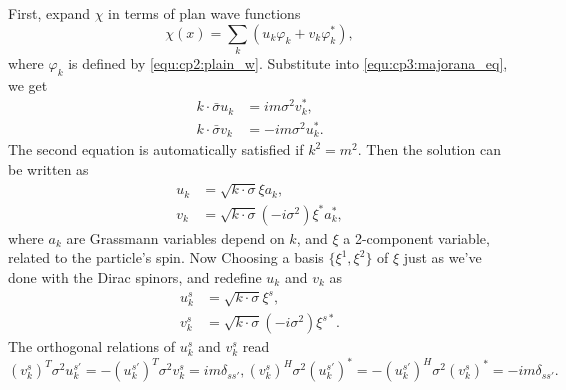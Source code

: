 \begin{problembody}
    \item First, expand $\chi$ in terms of plan wave functions
    \begin{equation}\label{equ:cp3:majorana_expand}
        \chi(x) = \sum_k \left(u_k \varphi_k + v_k \varphi_k^\ast\right),
    \end{equation}
    where $\varphi_k$ is defined by \eqref{equ:cp2:plain_w}. Substitute into \eqref{equ:cp3:majorana_eq}, we get
    \begin{subequations}
        \begin{align}
            k\cdot\bar{\sigma} u_k & = im\sigma^2 v_k^\ast, \\
            k\cdot\bar{\sigma} v_k & = -im\sigma^2 u_k^\ast.
        \end{align}
    \end{subequations}
    The second equation is automatically satisfied if $k^2 = m^2$. Then the solution can be written as
    \begin{subequations}\label{equ:cp3:majorana_spinor}
        \begin{align}
            u_k & = \sqrt{k\cdot\sigma}\xi a_k,\\
            v_k & = \sqrt{k\cdot\sigma} (-i\sigma^2) \xi^\ast a_k^\ast,
        \end{align}
    \end{subequations}
    where $a_k$ are Grassmann variables depend on $k$, and $\xi$ a 2-component variable, related to the particle's spin. Now  Choosing a basis $\{\xi^1, \xi^2\}$ of $\xi$ just
    as we've done with the Dirac spinors, and redefine $u_k$ and $v_k$ as
    \begin{subequations}
        \begin{align}
            u_k^s & = \sqrt{k\cdot\sigma} \xi^s, \\
            v_k^s & = \sqrt{k\cdot\sigma} (-i\sigma^2) \xi^{s\ast}.
        \end{align}
    \end{subequations}
    The orthogonal relations of $u_k^s$ and $v_k^s$ read
    \begin{subequations}
        \begin{equation}
            (v_k^s)^T\sigma^2 u_k^{s'} = -(u_k^{s'})^T\sigma^2 v_k^s = im\delta_{ss'},
        \end{equation}
        \begin{equation}
            (v_k^s)^H\sigma^2 (u_k^{s'})^\ast = -(u_k^{s'})^H\sigma^2 (v_k^s)^\ast = -im\delta_{ss'}.
        \end{equation}

\end{subequations}
\end{problembody}
